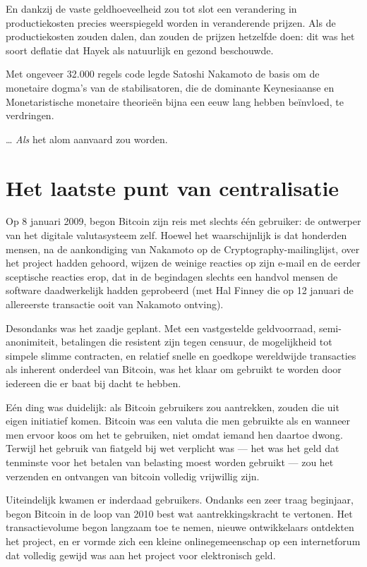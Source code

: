 \documentclass[
  a5paper,
  smalldemyvopaper,11pt,twoside,onecolumn,openright,extrafontsizes,
hidelinks]{memoir}
\begin{document}
En dankzij de vaste geldhoeveelheid zou tot slot een verandering in
productiekosten precies weerspiegeld worden in veranderende prijzen. Als
de productiekosten zouden dalen, dan zouden de prijzen hetzelfde doen:
dit was het soort deflatie dat Hayek als natuurlijk en gezond
beschouwde.

Met ongeveer 32.000 regels code legde Satoshi Nakamoto de basis om de
monetaire dogma's van de stabilisatoren, die de dominante Keynesiaanse
en Monetaristische monetaire theorieën bijna een eeuw lang hebben
beïnvloed, te verdringen.

\ldots{} \emph{Als} het alom aanvaard zou worden.

\section{Het laatste punt van
centralisatie}\label{het-laatste-punt-van-centralisatie}

Op 8 januari 2009, begon Bitcoin zijn reis met slechts één gebruiker: de
ontwerper van het digitale valutasysteem zelf. Hoewel het waarschijnlijk
is dat honderden mensen, na de aankondiging van Nakamoto op de
Cryptography-mailinglijst, over het project hadden gehoord, wijzen de
weinige reacties op zijn e-mail en de eerder sceptische reacties erop,
dat in de begindagen slechts een handvol mensen de software
daadwerkelijk hadden geprobeerd (met Hal Finney die op 12 januari de
allereerste transactie ooit van Nakamoto ontving).

Desondanks was het zaadje geplant. Met een vastgestelde geldvoorraad,
semi-anonimiteit, betalingen die resistent zijn tegen censuur, de
mogelijkheid tot simpele slimme contracten, en relatief snelle en
goedkope wereldwijde transacties als inherent onderdeel van Bitcoin, was
het klaar om gebruikt te worden door iedereen die er baat bij dacht te
hebben.

Eén ding was duidelijk: als Bitcoin gebruikers zou aantrekken, zouden
die uit eigen initiatief komen. Bitcoin was een valuta die men gebruikte
als en wanneer men ervoor koos om het te gebruiken, niet omdat iemand
hen daartoe dwong. Terwijl het gebruik van fiatgeld bij wet verplicht
was --- het was het geld dat tenminste voor het betalen van belasting
moest worden gebruikt --- zou het verzenden en ontvangen van bitcoin
volledig vrijwillig zijn.

Uiteindelijk kwamen er inderdaad gebruikers. Ondanks een zeer traag
beginjaar, begon Bitcoin in de loop van 2010 best wat aantrekkingskracht
te vertonen. Het transactievolume begon langzaam toe te nemen, nieuwe
ontwikkelaars ontdekten het project, en er vormde zich een kleine
onlinegemeenschap op een internetforum dat volledig gewijd was aan het
project voor elektronisch geld.
\end{document}
